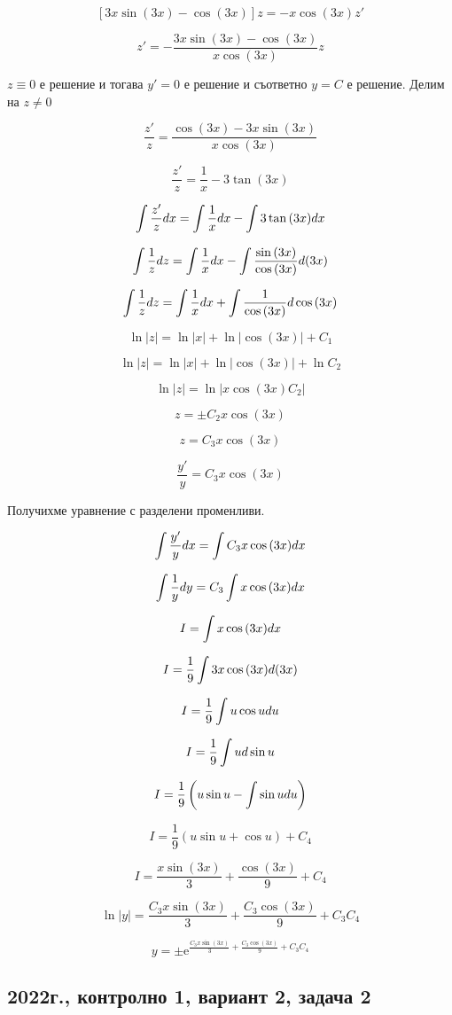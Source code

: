 \documentclass{scrartcl}
\begin{document}
$$[3x\sin(3x)-\cos(3x)]z = -x\cos(3x) z'$$

$$z' = -\dfrac{3x\sin(3x)-\cos(3x)}{x\cos{(3x)}}z$$

$z\equiv 0$ е решение и тогава $y' = 0$ е решение и съответно $y = C$ е решение. Делим на $z\ne 0$

$$\dfrac{z'}{z} = \dfrac{\cos(3x)-3x\sin(3x)}{x\cos{(3x)}}$$

$$\dfrac{z'}{z} = \dfrac{1}{x}-3\tan{(3x)}$$

$$\int \dfrac{z'}{z}\space dx = \int \dfrac{1}{x}\space dx-\int 3\tan{(3x)}\space dx$$

$$\int \dfrac{1}{z}\space dz = \int \dfrac{1}{x}\space dx-\int \dfrac{\sin{(3x)}}{\cos{(3x)}}\space d(3x)$$

$$\int \dfrac{1}{z}\space dz = \int \dfrac{1}{x}\space dx+\int \dfrac{1}{\cos{(3x)}}\space d\cos{(3x)}$$

$$\ln{|z|} = \ln{|x|}+\ln{|\cos{(3x)}|}+C_1$$

$$\ln{|z|} = \ln{|x|}+\ln{|\cos{(3x)}|}+\ln{C_2}$$

$$\ln{|z|} = \ln{|x\cos{(3x)}C_2|}$$

$$z = \pm C_2 x\cos{(3x)}$$

$$z = C_3 x\cos{(3x)}$$

$$\dfrac{y'}{y} = C_3 x\cos{(3x)}$$

Получихме уравнение с разделени променливи.

$$\int \dfrac{y'}{y}\space dx = \int C_3 x\cos{(3x)}\space dx$$

$$\int \dfrac{1}{y}\space dy =  C_3 \int x\cos{(3x)}\space dx$$

$$I = \int x\cos{(3x)}\space dx$$

$$I = \dfrac{1}{9}\int 3x\cos{(3x)}\space d(3x)$$

$$I = \dfrac{1}{9}\int u\cos{u}\space du$$

$$I = \dfrac{1}{9}\int u\space d\sin{u}$$

$$I = \dfrac{1}{9}\left(u\sin{u} - \int\sin{u}\space du\right)$$

$$I = \dfrac{1}{9}\left(u\sin{u} + \cos{u}\right) + C_4$$

$$I = \dfrac{x\sin{(3x)}}{3} + \dfrac{\cos{(3x)}}{9} + C_4$$

$$\ln{|y|} = \dfrac{C_3x\sin{(3x)}}{3} + \dfrac{C_3\cos{(3x)}}{9} + C_3C_4$$

$$y = \pm \mathrm{e}^{\frac{C_3x\sin{(3x)}}{3} + \frac{C_3\cos{(3x)}}{9} + C_3C_4}$$

\subsection{2022г., контролно 1, вариант 2, задача 2}
\end{document}
